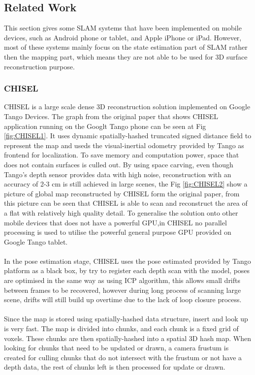 \documentclass[12pt,twoside]{article}
\begin{document}
\subsection{Related Work}

This section gives some SLAM systems that have been implemented on mobile devices, such as Android phone or tablet, and Apple iPhone or iPad. However, most of these systems mainly focus on the state estimation part of SLAM rather then the mapping part, which means they are not able to be used for 3D surface reconstruction purpose.

\subsubsection{CHISEL}
CHISEL\citep{klingensmith2015chisel} is a large scale dense 3D reconstruction solution implemented on Google Tango Devices. The graph from the original paper that shows CHISEL application running on the Googlt Tango phone can be seen at Fig \ref{fig:CHISEL1}. It uses dynamic spatially-hashed truncated signed distance field\citep{niessner2013real} to represent the map and useds the visual-inertial odometry provided by Tango as frontend for localization. To save memory and computation power, space that does not contain surfaces is culled out. By using space carving, even though Tango's depth sensor provides data with high noise, reconstruction with an accuracy of 2-3 cm is still achieved in large scenes, the Fig \ref{fig:CHISEL2} show a picture of global map reconstructed by CHISEL form the original paper, from this picture can be seen that CHISEL is able to scan and reconstruct the area of a flat with relatively high quality detail. To generalise the solution onto other mobile devices that does not have a powerful GPU,in CHISEL no parallel processing is used to utilise the powerful general purpose GPU provided on Google Tango tablet.\\
\\
In the pose estimation stage, CHISEL uses the pose estimated provided by Tango platform as a black box, by try to register each depth scan with the model, poses are optimised in the same way as using ICP algorithm, this allows small drifts between frames to be recovered, however during long process of scanning large scene, drifts will still build up overtime due to the lack of loop closure process.\\
\\
Since the map is stored using spatially-hashed data structure, insert and look up is very fast. The map is divided into chunks, and each chunk is a fixed grid of voxels. These chunks are then spatially-hashed into a spatial 3D hash map. When looking for chunks that need to be updated or drawn, a camera frustum is created for culling chunks that do not intersect with the frustum or not have a depth data, the rest of chunks left is then processed for update or drawn.\\
\end{document}

